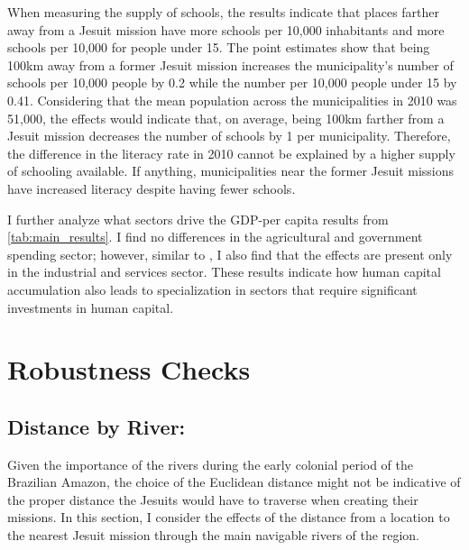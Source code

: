 \documentclass{article}
\begin{document}
When measuring the supply of schools, the results indicate that places farther away from a Jesuit mission have more schools per 10,000 inhabitants and more schools per 10,000 for people under 15. 
The point estimates show that being 100km away from a former Jesuit mission increases the municipality's number of schools per 10,000 people by 0.2 while the number per 10,000 people under 15 by 0.41. 
Considering that the mean population across the municipalities in 2010 was 51,000, the effects would indicate that, on average, being 100km farther from a Jesuit mission decreases the number of schools by 1 per municipality. 
Therefore, the difference in the literacy rate in 2010 cannot be explained by a higher supply of schooling available.
If anything, municipalities near the former Jesuit missions have increased literacy despite having fewer schools.

I further analyze what sectors drive the GDP-per capita results from \autoref{tab:main_results}. 
I find no differences in the agricultural and government spending sector; however, similar to \textcite{Valencia_Caicedo2018-gp}, I also find that the effects are present only in the industrial and services sector. 
These results indicate how human capital accumulation also leads to specialization in sectors that require significant investments in human capital.


\section{Robustness Checks}

\subsection{Distance by River:}

Given the importance of the rivers during the early colonial period of the Brazilian Amazon, the choice of the Euclidean distance might not be indicative of the proper distance the Jesuits would have to traverse when creating their missions. In this section, I consider the effects of the distance from a location to the nearest Jesuit mission through the main navigable rivers of the region. 

\end{document}
